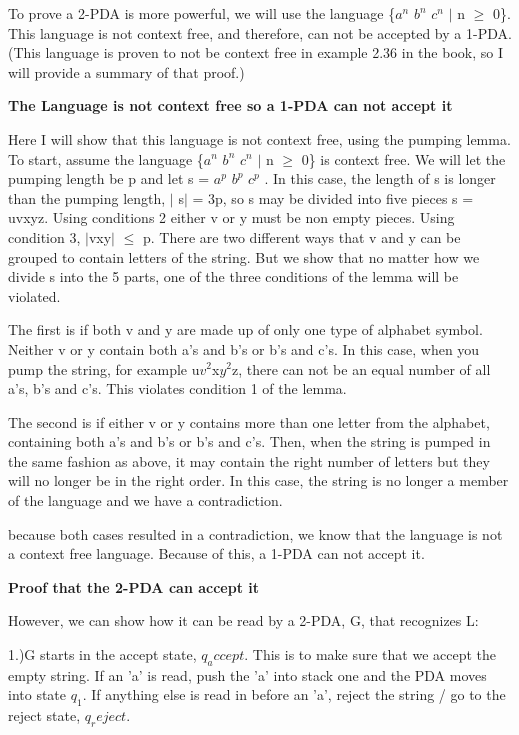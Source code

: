 \documentclass[12pt]{article}
\begin{document}
To prove a 2-PDA is more powerful, we will use the language \{$a^n$ $b^n$ $c^n$ $|$ n $\geq$ 0\}. This language is not context free, and therefore, can not be accepted by a 1-PDA. (This language is proven to not be context free in example 2.36 in the book, so I will provide a summary of that proof.)

{\bfseries The Language is not context free so a 1-PDA can not accept it}

Here I will show that this language is not context free, using the pumping lemma. To start, assume the language \{$a^n$ $b^n$ $c^n$ $|$ n $\geq$ 0\} is context free. We will let the pumping length be p and let s = $a^p$ $b^p$ $c^p$ . In this case, the length of s is longer than the pumping length, $|$ s$|$ = 3p, so s may be divided into five pieces s = uvxyz. Using conditions 2 either v or y must be non empty pieces. Using condition 3,  $|$vxy$|$ $\leq$ p. There are two different ways that v and y can be grouped to contain letters of the string. But we show that no matter how we divide s into the 5 parts, one of the three conditions of the lemma will be violated. 

The first is if both v and y are made up of only one type of alphabet symbol. Neither v or y contain both a's and b's or b's and c's. In this case, when you pump the string, for example u$v^2$x$y^2$z, there can not be an equal number of all a's, b's and c's. This violates condition 1 of the lemma.

The second is if either v or y contains more than one letter from the alphabet, containing both a's and b's or b's and c's. Then, when the string is pumped in the same fashion as above, it may contain the right number of letters but they will no longer be in the right order. In this case, the string is no longer a member of the language and we have a contradiction.

because both cases resulted in a contradiction, we know that the language is not a context free language. Because of this, a 1-PDA can not accept it.

{\bfseries Proof that the 2-PDA can accept it}

However, we can show how it can be read by a 2-PDA, G, that recognizes L:

1.)G starts in the accept state, $q_accept$. This is to make sure that we accept the empty string. If an 'a' is read, push the 'a' into stack one and the PDA moves into state $q_1$. If anything else is read in before an 'a', reject the string / go to the reject state, $q_reject$.
\end{document}
